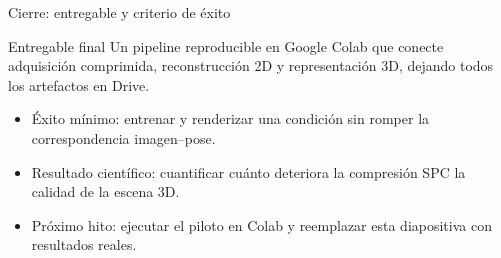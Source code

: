 \documentclass[aspectratio=169,11pt]{beamer}
\begin{document}
\begin{frame}{Cierre: entregable y criterio de éxito}
\begin{block}{Entregable final}
  Un pipeline reproducible en Google Colab que conecte adquisición comprimida, reconstrucción 2D y representación 3D, dejando todos los artefactos en Drive.
\end{block}
\vspace{0.5em}
\vspace{0.65em}
\begin{itemize}
  \item Éxito mínimo: entrenar y renderizar una condición sin romper la correspondencia imagen--pose.
  \item Resultado científico: cuantificar cuánto deteriora la compresión SPC la calidad de la escena 3D.
  \item Próximo hito: ejecutar el piloto en Colab y reemplazar esta diapositiva con resultados reales.
\end{itemize}
\vfill
{}
\end{frame}
\end{document}
